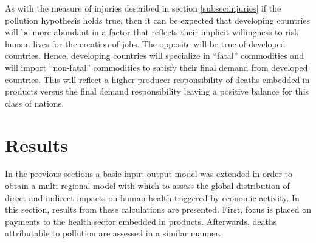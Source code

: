 \documentclass[a4paper,12pt, ]{article}
\begin{document}
As with the measure of injuries described in section \ref{subsec:injuries} if the pollution hypothesis holds true, then it can be expected that developing countries will be more abundant in a factor that reflects their implicit willingness to risk human lives for the creation of jobs. The opposite will be true of developed countries. Hence, developing countries will specialize in ``fatal'' commodities and will import ``non-fatal'' commodities to satisfy their final demand from developed countries. This will reflect a higher producer responsibility of deaths embedded in products versus the final demand responsibility leaving a positive balance for this class of nations.

\newpage
%
%
%
%
%
% 

\section{Results}
\label{sec:results}

In the previous sections a basic input-output model was extended in order to obtain a multi-regional model with which to assess the global distribution of direct and indirect impacts on human health triggered by economic activity. In this section, results from these calculations are presented. First, focus is placed on payments to the health sector embedded in products. Afterwards, deaths attributable to pollution are assessed in a similar manner. 
\end{document}
